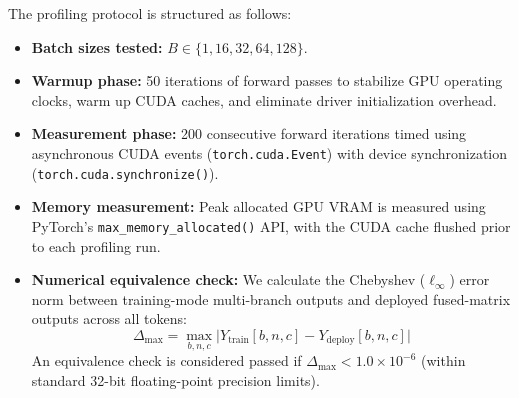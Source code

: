 The profiling protocol is structured as follows:
\begin{itemize}
    \item \textbf{Batch sizes tested:} $B \in \{1, 16, 32, 64, 128\}$.
    \item \textbf{Warmup phase:} 50 iterations of forward passes to stabilize GPU operating clocks, warm up CUDA caches, and eliminate driver initialization overhead.
    \item \textbf{Measurement phase:} 200 consecutive forward iterations timed using asynchronous CUDA events (\texttt{torch.cuda.Event}) with device synchronization (\texttt{torch.cuda.synchronize()}).
    \item \textbf{Memory measurement:} Peak allocated GPU VRAM is measured using PyTorch's \texttt{max\_memory\_allocated()} API, with the CUDA cache flushed prior to each profiling run.
    \item \textbf{Numerical equivalence check:} We calculate the Chebyshev ($\ell_\infty$) error norm between training-mode multi-branch outputs and deployed fused-matrix outputs across all tokens:
    \begin{equation}
        \Delta_{\text{max}} = \max_{b, n, c} \big| Y_{\text{train}}[b, n, c] - Y_{\text{deploy}}[b, n, c] \big|
    \end{equation}
    An equivalence check is considered passed if $\Delta_{\text{max}} < 1.0 \times 10^{-6}$ (within standard 32-bit floating-point precision limits).
\end{itemize}
